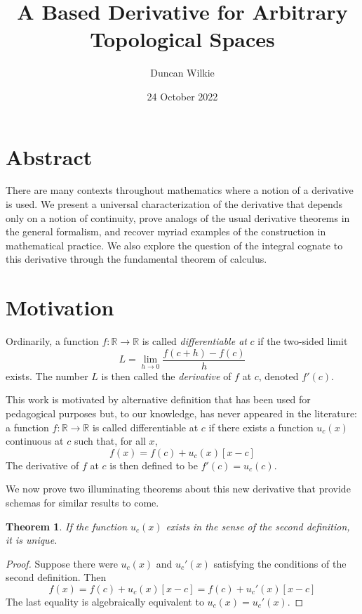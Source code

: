 \documentclass{article}
\title{A Based Derivative for Arbitrary Topological Spaces}
\author{Duncan Wilkie}
\date{24 October 2022}
\newtheorem{thm}{Theorem}
\begin{document}
\maketitle

\section{Abstract}
There are many contexts throughout mathematics where a notion of a derivative is used.
We present a universal characterization of the derivative that depends only on a notion of continuity,
prove analogs of the usual derivative theorems in the general formalism, and recover myriad examples of the construction in mathematical practice.
We also explore the question of the integral cognate to this derivative through the fundamental theorem of calculus.

\section{Motivation}
Ordinarily, a function $f: \mathbb{R} \to \mathbb{R}$ is called \textit{differentiable at} $c$ if the two-sided limit
\[
  L = \lim_{h \to 0}\frac{f(c + h) - f(c)}{h}
\]
exists.
The number $L$ is then called the \textit{derivative} of $f$ at $c$, denoted $f'(c)$.

This work is motivated by alternative definition that has been used for pedagogical purposes but, to our knowledge, has never appeared in the literature:
a function $f: \mathbb{R} \to \mathbb{R}$ is called differentiable at $c$ if there exists a function $u_{c}(x)$ continuous at $c$ such that, for all $x$,
\[
  f(x) = f(c) + u_{c}(x)[x - c]
\]
The derivative of $f$ at $c$ is then defined to be $f'(c) = u_{c}(c)$.

We now prove two illuminating theorems about this new derivative that provide schemas for similar results to come.

\begin{thm}
  If the function $u_{c}(x)$ exists in the sense of the second definition, it is unique.
\end{thm}

\begin{proof}
  Suppose there were $u_{c}(x)$ and $u_{c}'(x)$ satisfying the conditions of the second definition.
  Then
  \[
    f(x) = f(c) + u_{c}(x)[x - c] = f(c) + u_{c}'(x)[x - c]
  \]
  The last equality is algebraically equivalent to $u_{c}(x) = u_{c}'(x)$.
\end{proof}
\end{document}
